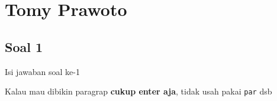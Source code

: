 
\section{Tomy Prawoto}
\subsection{Soal 1}
Isi jawaban soal ke-1

Kalau mau dibikin paragrap \textbf{cukup enter aja}, tidak usah pakai \verb|par| dsb


